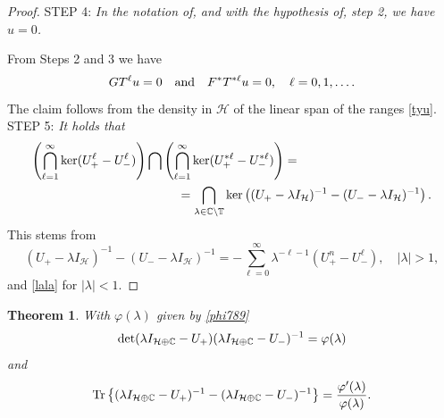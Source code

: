 \documentclass[12pt]{amsart}
\newtheorem{thm}{Theorem}[section]
\theoremstyle{definition}
\theoremstyle{remark}
\numberwithin{equation}{section}
\begin{document}
\begin{proof}
    STEP 4: {\sl In the notation of, and with the hypothesis of, step 2, we have $u=0$.}\smallskip

    From Steps 2 and 3 we have
    \[
        GT^\ell u=0\quad{\rm and}\quad        F^*T^{*\ell}u=0,\quad \ell=0,1,\ldots .
      \]
    The claim follows from the density in $\mathcal H$ of the linear span of the ranges \eqref{tyu}.\\

    STEP 5: {\sl It holds that
      \[
        \begin{split}
\left(\bigcap_{\ell=1}^\infty\ker (U_+^\ell-U_-^\ell) \right)\bigcap    \left(   \bigcap_{\ell=1}^\infty\ker (U_+^{*\ell}-U_-^{*\ell})\right)
&=\\
&\hspace{-3cm}=\bigcap_{\lambda\in\mathbb C\setminus\mathbb T}\ker\left((U_+-\lambda I_{\mathcal H})^{-1}-(U_--\lambda I_{\mathcal H})^{-1}\right).
\end{split}
\]}
This stems from
\[
(U_+-\lambda I_{\mathcal H})^{-1}-(U_--\lambda I_{\mathcal H})^{-1}=-\sum_{\ell=0}^\infty \lambda^{-\ell-1}(U_+^n-U_-^\ell), \quad |\lambda|>1,
\]
and \eqref{lala} for $|\lambda|<1$.


\end{proof}

\begin{thm}
With $\varphi({\lambda})$ given by \eqref{phi789}
\[
 {\rm det}({\lambda}I_{\mathcal H\oplus\mathbb C}-U_+)({\lambda}I_{\mathcal H\oplus\mathbb C}-U_-)^{-1}=\varphi({\lambda})
\]
and
\[
{\rm Tr}\left\{({\lambda}I_{\mathcal H\oplus\mathbb C}-U_+)^{-1}-({\lambda}I_{\mathcal H\oplus\mathbb C}-U_-)^{-1}\right\}=\frac{\varphi^\prime({\lambda})}{\varphi({\lambda})}.
\]
\end{thm}
\end{document}
